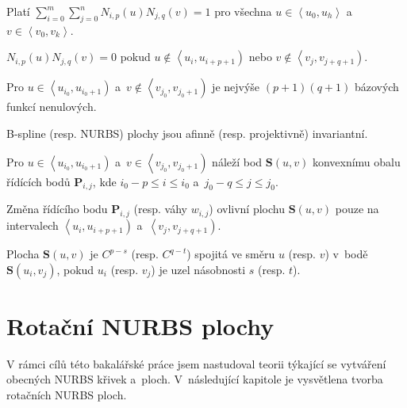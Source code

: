 \begin{veta}
	Platí $\sum_{i=0}^{m}\sum_{j=0}^{n}N_{i,p}\left(u\right)N_{j,q}\left(v\right)=1$ pro všechna $u \in \left\langle u_0,u_h \right\rangle$ a~$v \in \left\langle v_0,v_k \right\rangle$.
\end{veta}

\begin{veta}
	${N}_{i,p}\left(u\right){N}_{j,q}\left(v\right)=0$ pokud $u \notin \left\langle u_i,u_{i+p+1} \right)$ nebo $v \notin \left\langle v_j,v_{j+q+1} \right)$.
\end{veta}

\begin{veta}
	Pro $u \in \left\langle u_{i_0},u_{i_0+1} \right)$ a~$v \notin \left\langle v_{j_0},v_{j_0+1} \right)$ je nejvýše $\left(p+1\right) \left(q+1\right)$ bázových funkcí nenulových.
\end{veta}

\begin{veta}[Invariance]
	B-spline (resp. NURBS) plochy jsou afinně (resp. projektivně) invariantní.
\end{veta}

\begin{veta}
	Pro $u \in \left\langle u_{i_0},u_{i_0+1} \right)$ a~$v \in \left\langle v_{j_0},v_{j_0+1} \right)$ náleží bod $\mathbf{S}\left( u,v\right)$ konvexnímu obalu řídících bodů $\mathbf{P}_{i,j}$, kde $i_0-p\leq i \leq i_0$ a~$j_0-q\leq j \leq j_0$.
\end{veta}

\begin{veta}
	Změna řídícího bodu $\mathbf{P}_{i,j}$ (resp. váhy $w_{i,j}$) ovlivní plochu $\mathbf{S}\left(u,v\right)$ pouze na intervalech $\left\langle u_i, u_{i+p+1}\right)$ a~$\left\langle v_j, v_{j+q+1}\right)$.
\end{veta}

\begin{veta}
	Plocha $\mathbf{S}\left(u,v\right)$ je $C^{p-s}$ (resp. $C^{q-t}$) spojitá ve směru $u$ (resp. $v$) v~bodě $\mathbf{S}\left(u_i,v_j\right)$, pokud $u_i$ (resp. $v_j$) je uzel násobnosti $s$ (resp. $t$).
\end{veta}


\chapter{Rotační NURBS plochy}

V rámci cílů této bakalářské práce jsem nastudoval teorii týkající se vytváření obecných NURBS křivek a~ploch. V~následující kapitole je vysvětlena tvorba rotačních NURBS ploch.

